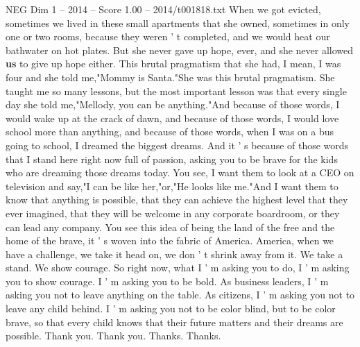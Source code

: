 \begin{textsample}{NEG Dim 1 – 2014 – Score 1.00 – 2014/t001818.txt}
When we got evicted, sometimes we lived in these small apartments that she owned, sometimes in only one or two rooms, because they weren ' t completed, and we would heat our bathwater on hot plates.
But she never gave up hope, ever, and she never allowed \textbf{us} to give up hope either.
This brutal pragmatism that she had, I mean, I was four and she told me,"Mommy is Santa."She was this brutal pragmatism.
She taught me so many lessons, but the most important lesson was that every single day she told me,"Mellody, you can be anything."And because of those words, I would wake up at the crack of dawn, and because of those words, I would love school more than anything, and because of those words, when I was on a bus going to school, I dreamed the biggest dreams.
And it ' s because of those words that I stand here right now full of passion, asking you to be brave for the kids who are dreaming those dreams today.
You see, I want them to look at a CEO on television and say,"I can be like her,"or,"He looks like me."And I want them to know that anything is possible, that they can achieve the highest level that they ever imagined, that they will be welcome in any corporate boardroom, or they can lead any company.
You see this idea of being the land of the free and the home of the brave, it ' s woven into the fabric of America.
America, when we have a challenge, we take it head on, we don ' t shrink away from it.
We take a stand.
We show courage.
So right now, what I ' m asking you to do, I ' m asking you to show courage.
I ' m asking you to be bold.
As business leaders, I ' m asking you not to leave anything on the table.
As citizens, I ' m asking you not to leave any child behind.
I ' m asking you not to be color blind, but to be color brave, so that every child knows that their future matters and their dreams are possible.
Thank you.
Thank you.
Thanks.
Thanks.

\end{textsample}
